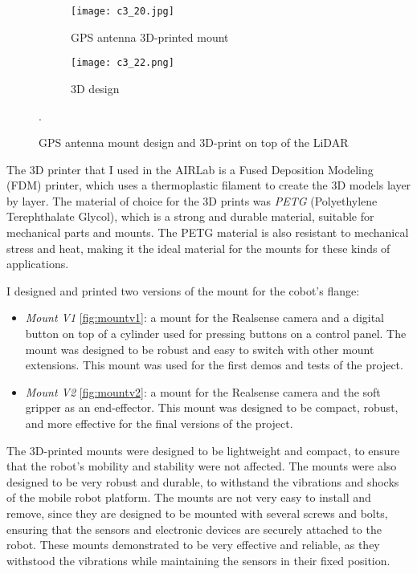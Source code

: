 \begin{figure}[t]
    \centering
    \begin{subfigure}{0.3\textwidth}
        \texttt{[image: c3\_20.jpg]}
        \captionsetup{width=0.9\linewidth}
        \caption{GPS antenna 3D-printed mount}
        \label{fig:gps3d}
    \end{subfigure}
    \hfill
    \begin{subfigure}{0.67\textwidth}
        \texttt{[image: c3\_22.png]}
        \caption{3D design}
        \label{fig:gpsprint}
    \end{subfigure}
    \captionsetup{width=1\linewidth}
    \caption{GPS antenna mount design and 3D-print on top of the LiDAR}.
    \label{fig:c3_gps}
\end{figure}

The 3D printer that I used in the AIRLab is a Fused Deposition Modeling (FDM) printer,
which uses a thermoplastic filament to create the 3D models layer by layer. The material of choice
for the 3D prints was \textit{PETG} (Polyethylene Terephthalate Glycol), which is a strong and durable material,
suitable for mechanical parts and mounts. The PETG material is also resistant to mechanical stress and heat,
making it the ideal material for the mounts for these kinds of applications.

I designed and printed two versions of the mount for the cobot's flange:

\begin{itemize}
    \item \textit{Mount V1} \ref{fig:mountv1}: a mount for the Realsense camera and a digital button on top of a cylinder used
    for pressing buttons on a control panel. The mount was designed to be robust and easy to switch with other
    mount extensions. This mount was used for the first demos and tests of the project.
    \item \textit{Mount V2} \ref{fig:mountv2}: a mount for the Realsense camera and the soft gripper as an end-effector.
    This mount was designed to be compact, robust, and more effective for the final versions of the project.
\end{itemize}

The 3D-printed mounts were designed to be lightweight and compact, to ensure that the robot's mobility and stability
were not affected. The mounts were also designed to be very robust and durable, to withstand the vibrations and shocks
of the mobile robot platform. The mounts are not very easy to install and remove, since they are designed to be
mounted with several screws and bolts, ensuring that the sensors and electronic devices are securely attached to the robot.
These mounts demonstrated to be very effective and reliable, as they withstood the vibrations while maintaining
the sensors in their fixed position.

